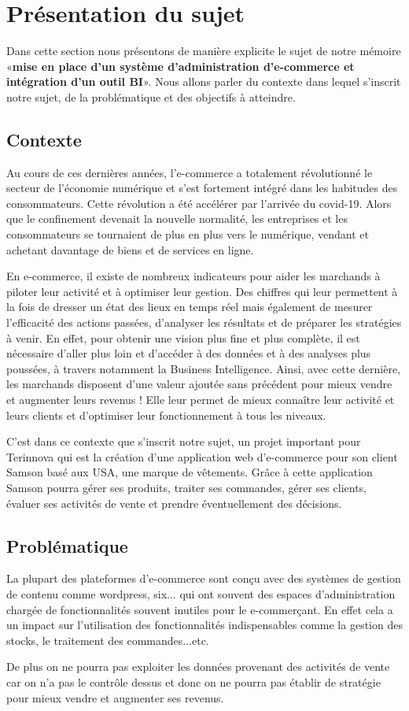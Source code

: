 \documentclass[a4paper, 12pt]{report}
\begin{document}
\section{Présentation du sujet}
{Dans cette section nous présentons de manière explicite le sujet de notre mémoire «\textbf{mise en place d’un système d’administration d’e-commerce et intégration d’un outil BI}». Nous allons parler du contexte dans lequel s’inscrit notre sujet, de la problématique et des objectifs à atteindre.}
\subsection{Contexte}
{Au cours de ces dernières années, l'e-commerce a totalement révolutionné le secteur de l’économie numérique et s’est fortement intégré dans les habitudes des consommateurs. Cette révolution a été accélérer par l’arrivée du covid-19. Alors que le confinement devenait la nouvelle normalité, les entreprises et les consommateurs se tournaient de plus en plus vers le numérique, vendant et achetant davantage de biens et de services en ligne. 

En e-commerce, il existe de nombreux indicateurs pour aider les marchands à piloter leur activité et à optimiser leur gestion. Des chiffres qui leur permettent à la fois de dresser un état des lieux en temps réel mais également de mesurer l’efficacité des actions passées, d’analyser les résultats et de préparer les stratégies à venir. En effet, pour obtenir une vision plus fine et plus complète, il est nécessaire d’aller plus loin et d’accéder à des données et à des analyses plus poussées, à travers notamment la Business Intelligence. Ainsi, avec cette dernière, les marchands disposent d’une valeur ajoutée sans précédent pour mieux vendre et augmenter leurs revenus ! Elle leur permet de mieux connaître leur activité et leurs clients et d’optimiser leur fonctionnement à tous les niveaux.

C’est dans ce contexte que s'inscrit notre sujet, un projet important pour Terinnova qui est la création d'une application web d’e-commerce pour son client Samson basé aux USA, une marque de vêtements. Grâce à cette application Samson pourra gérer ses produits, traiter ses commandes, gérer ses clients, évaluer ses activités de vente et prendre éventuellement des décisions.}
\subsection{Problématique}
{La plupart des plateformes d’e-commerce sont conçu avec des systèmes de gestion de contenu comme wordpress, six... qui ont souvent des espaces d’administration chargée de fonctionnalités souvent inutiles pour le e-commerçant. En effet cela a un impact sur l’utilisation des fonctionnalités indispensables comme la gestion des stocks, le traitement des commandes...etc.

De plus on ne pourra pas exploiter les données provenant des activités de vente car on n'a pas le contrôle dessus et donc on ne pourra pas établir de stratégie pour mieux vendre et augmenter ses revenus.}
\end{document}
